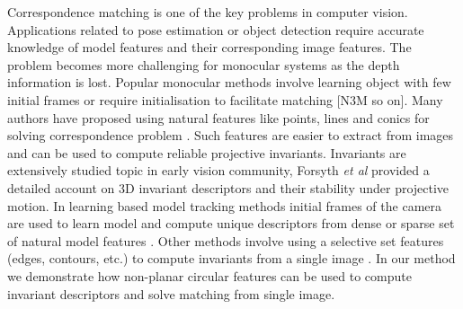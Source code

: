 \documentclass{bmvc2k}
\def\etal{\emph{et al}\bmvaOneDot}
\begin{document}
Correspondence matching is one of the key problems in computer vision. Applications related to pose estimation or object detection require accurate knowledge of model features and their corresponding image features. 
The problem becomes more challenging for monocular systems as the depth information is lost. Popular monocular methods involve learning object with few initial frames or require initialisation to facilitate matching [N3M so on]. Many authors have proposed using natural features like points, lines and conics for solving correspondence problem \cite{hartley_multiple_2003}. Such features are easier to extract from images and can be used to compute reliable projective invariants. Invariants are extensively studied topic in early vision community, Forsyth \etal \cite{forsyth_91} provided a detailed account on 3D invariant descriptors and their stability under projective motion. 
In learning based model tracking methods initial frames of the camera are used to learn model and compute unique descriptors from dense or sparse set of natural model features \cite{chekhlov_ninja_2007} \cite{hinterstoisser_n3m:_2007} \cite{lowe_object_1999}. Other methods involve using a selective set features (edges, contours, etc.) to compute invariants from a single image \cite{lepetit_monocular_2005}. In our method we demonstrate how non-planar circular features can be used to compute invariant descriptors and solve matching from single image. 

\end{document}
